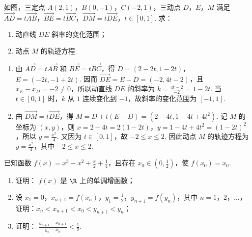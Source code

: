 \begin{problem}
如图，三定点 \(A(2,1)\)，\(B(0,-1)\)，\(C(-2,1)\)，三动点 \(D\)，\(E\)，\(M\) 满足 \(\overrightarrow{AD} = t\overrightarrow{AB}\)，\(\overrightarrow{BE} = t\overrightarrow{BC}\)，\(\overrightarrow{DM} = t\overrightarrow{DE}\)，\(t \in [0,1]\). 求：

\begin{enumerate}
\item 动直线 \(DE\) 斜率的变化范围；
\item 动点 \(M\) 的轨迹方程.
\end{enumerate}

\end{problem}

\begin{solution}
\begin{enumerate}
\item 由 \(\overrightarrow{AD}=t\overrightarrow{AB}\) 和 \(\overrightarrow{BE}=t\overrightarrow{BC}\)，得 \(D=(2-2t,1-2t)\)，\(E=(-2t,-1+2t)\). 因而 \(\overrightarrow{DE}=E-D=(-2,4t-2)\)，且 \(x_E-x_D=-2\neq0\)，所以动直线 \(DE\) 的斜率为 \(k=\frac{4t-2}{-2}=1-2t\). 当 \(t\in[0,1]\) 时，\(k\) 从 \(1\) 连续变化到 \(-1\)，故斜率的变化范围为 \([-1,1]\).
\item 由 \(\overrightarrow{DM}=t\overrightarrow{DE}\)，得 \(M=D+t(E-D)=(2-4t,1-4t+4t^2)\). 记 \(M\) 的坐标为 \((x,y)\)，则 \(x=2-4t=2(1-2t)\)，\(y=1-4t+4t^2=(1-2t)^2\)，所以 \(y=\frac{x^2}{4}\). 又因为 \(t\in[0,1]\)，故 \(-2\leqslant x\leqslant2\). 因此动点 \(M\) 的轨迹方程为 \(y=\frac{x^2}{4}\)，其中 \(-2\leqslant x\leqslant2\).
\end{enumerate}
\end{solution}

\begin{problem}
已知函数 \( f(x) = x^3 - x^2 + \frac{x}{2} + \frac{1}{4} \)，且存在 \( x_0 \in \left(0, \frac{1}{2}\right) \)，使 \( f(x_0) = x_0 \).

\begin{enumerate}
\item 证明： \( f(x) \) 是 \(\R\) 上的单调增函数；
\item 设 \(x_{1} = 0\)，\(x_{n + 1} = f(x_{n})\)，\(y_{1} = \frac{1}{2}\)，\(y_{n + 1} = f(y_{n})\)，其中 \(n = 1\)，\(2\)，\(\dots\)，证明：\(x_{n} < x_{n + 1} < x_0 < y_{n + 1} < y_{n}\)；
\item 证明： \( \frac{y_{n+1}-x_{n+1}}{y_{n}-x_{n}}<\frac{1}{2} \).
\end{enumerate}
\end{problem}

